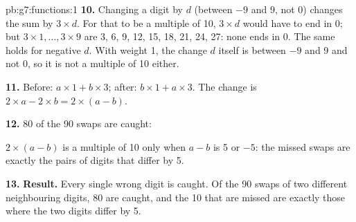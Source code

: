 \begin{solution}{pb:g7:functions:1}
\textbf{10.} Changing a digit by $d$ (between $-9$ and 9, not 0) changes the
sum by $3 \times d$. For that to be a multiple of 10, $3 \times d$ would have to
end in 0; but $3 \times 1, \dots, 3 \times 9$ are 3, 6, 9, 12, 15, 18, 21, 24,
27: none ends in 0. The same holds for negative $d$. With weight 1, the change
$d$ itself is between $-9$ and 9 and not 0, so it is not a multiple of 10
either.

\textbf{11.} Before: $a \times 1 + b \times 3$; after: $b \times 1 + a \times
3$. The change is $2 \times a - 2 \times b = 2 \times (a - b)$.

\textbf{12.} 80 of the 90 swaps are caught:

\label{out:g7:functions:swaps}

$2 \times (a - b)$ is a multiple of 10 only when $a - b$ is 5 or $-5$: the
missed swaps are exactly the pairs of digits that differ by 5.

\textbf{13.} \textbf{Result.} Every single wrong digit is caught. Of the 90
swaps of two different neighbouring digits, 80 are caught, and the 10 that are
missed are exactly those where the two digits differ by 5.
\end{solution}
